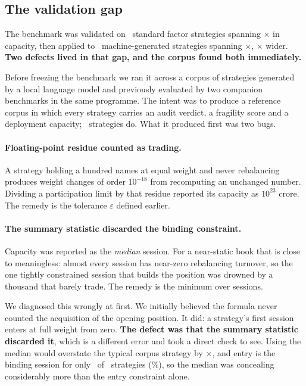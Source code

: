\documentclass[11pt,a4paper]{article}
\begin{document}
\subsection{The validation gap}
\label{sec:validation}

\begin{finding}
The benchmark was validated on \fsNFactors\ standard factor strategies spanning
\fsFactorSpan$\times$ in capacity, then applied to \fsCorpusN\ machine-generated strategies spanning
\fsCorpusSpan$\times$, \fsSpanRatio$\times$ wider. \textbf{Two defects lived in that gap, and the
corpus found both immediately.}
\end{finding}

Before freezing the benchmark we ran it across a corpus of strategies generated by a local language
model and previously evaluated by two companion benchmarks in the same programme. The intent was to
produce a reference corpus in which every strategy carries an audit verdict, a fragility score and a
deployment capacity; \fsCorpusAllThree\ strategies do. What it produced first was two bugs.

\paragraph{Floating-point residue counted as trading.} A strategy holding a hundred names at equal
weight and never rebalancing produces weight changes of order $10^{-18}$ from recomputing an
unchanged number. Dividing a participation limit by that residue reported its capacity as $10^{23}$
crore. The remedy is the tolerance $\varepsilon$ defined earlier.

\paragraph{The summary statistic discarded the binding constraint.} Capacity was reported as the
\emph{median} session. For a near-static book that is close to meaningless: almost every session has
near-zero rebalancing turnover, so the one tightly constrained session that builds the position was
drowned by a thousand that barely trade. The remedy is the minimum over sessions.

We diagnosed this wrongly at first. We initially believed the formula never counted the acquisition
of the opening position. It did: a strategy's first session enters at full weight from zero.
\textbf{The defect was that the summary statistic discarded it}, which is a different error and took
a direct check to see. Using the median would overstate the typical corpus strategy by
\fsCorpusMedianOverBinding$\times$, and entry is the binding session for only \fsEntryBindsCount\ of
\fsCorpusN\ strategies (\fsEntryBindsShare\%), so the median was concealing considerably more than
the entry constraint alone.
\end{document}
